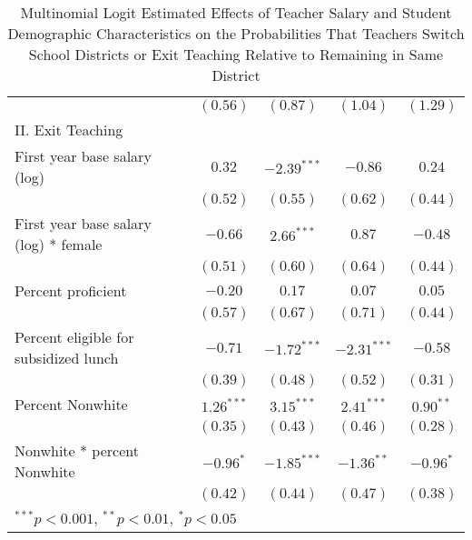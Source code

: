 \documentclass[12pt,]{article}
\begin{document}
\begin{sidewaystable}
\begin{center}
\begin{tabular}{l c c c c }
                                                & $(0.56)$      & $(0.87)$      & $(1.04)$      & $(1.29)$     \\
II. Exit Teaching                               &               &               &               &              \\
\quad First year base salary (log)           & $0.32$        & $-2.39^{***}$ & $-0.86$       & $0.24$       \\
                                                & $(0.52)$      & $(0.55)$      & $(0.62)$      & $(0.44)$     \\
\quad First year base salary (log) * female  & $-0.66$       & $2.66^{***}$  & $0.87$        & $-0.48$      \\
                                                & $(0.51)$      & $(0.60)$      & $(0.64)$      & $(0.44)$     \\
\quad Percent proficient                     & $-0.20$       & $0.17$        & $0.07$        & $0.05$       \\
                                                & $(0.57)$      & $(0.67)$      & $(0.71)$      & $(0.44)$     \\
\quad Percent eligible for subsidized lunch  & $-0.71$       & $-1.72^{***}$ & $-2.31^{***}$ & $-0.58$      \\
                                                & $(0.39)$      & $(0.48)$      & $(0.52)$      & $(0.31)$     \\
\quad Percent Nonwhite                       & $1.26^{***}$  & $3.15^{***}$  & $2.41^{***}$  & $0.90^{**}$  \\
                                                & $(0.35)$      & $(0.43)$      & $(0.46)$      & $(0.28)$     \\
\quad Nonwhite * percent Nonwhite            & $-0.96^{*}$   & $-1.85^{***}$ & $-1.36^{**}$  & $-0.96^{*}$  \\
                                                & $(0.42)$      & $(0.44)$      & $(0.47)$      & $(0.38)$     \\
\hline
\multicolumn{5}{l}{\scriptsize{$^{***}p<0.001$, $^{**}p<0.01$, $^*p<0.05$}}
\end{tabular}
\caption{Multinomial Logit Estimated Effects of Teacher Salary and Student Demographic Characteristics on the Probabilities That Teachers Switch School Districts or Exit Teaching Relative to Remaining in Same District}
\label{tbl:reg_mlogit}
\end{center}
\end{sidewaystable}
\end{document}
